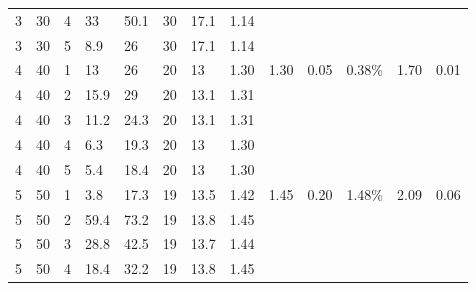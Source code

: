 \documentclass[a4paper]{article}
\newcommand{\grayrow}{\rowcolor[gray]{0.925}}
\begin{document}
\begin{table}
\begin{tabularx}{\textwidth}{ X X X X X X X X X X X X X }
        3 & 30 & 4 & 33 & 50.1 & 30 & 17.1 & 1.14  & ~ & ~ & ~ & ~ &   \\ %
        \grayrow 3 & 30 & 5 & 8.9 & 26 & 30 & 17.1 & 1.14  & ~ & ~ & ~ & ~ &   \\ %
        4 & 40 & 1 & 13 & 26 & 20 & 13 & 1.30  & 1.30  & 0.05  & 0.38\% & 1.70  & 0.01   \\ %
        \grayrow 4 & 40 & 2 & 15.9 & 29 & 20 & 13.1 & 1.31  & ~ & ~ & ~ & ~ &   \\ %
        4 & 40 & 3 & 11.2 & 24.3 & 20 & 13.1 & 1.31  & ~ & ~ & ~ & ~ &   \\ %
        \grayrow 4 & 40 & 4 & 6.3 & 19.3 & 20 & 13 & 1.30  & ~ & ~ & ~ & ~ &   \\ %
        4 & 40 & 5 & 5.4 & 18.4 & 20 & 13 & 1.30  & ~ & ~ & ~ & ~ &   \\ %
        \grayrow 5 & 50 & 1 & 3.8 & 17.3 & 19 & 13.5 & 1.42  & 1.45  & 0.20  & 1.48\% & 2.09  & 0.06   \\ %
        5 & 50 & 2 & 59.4 & 73.2 & 19 & 13.8 & 1.45  & ~ & ~ & ~ & ~ &   \\ %
        \grayrow 5 & 50 & 3 & 28.8 & 42.5 & 19 & 13.7 & 1.44  & ~ & ~ & ~ & ~ &   \\ %
        5 & 50 & 4 & 18.4 & 32.2 & 19 & 13.8 & 1.45  & ~ & ~ & ~ & ~ &   \\ \hline
    \end{tabularx}
\end{table}
\end{document}
